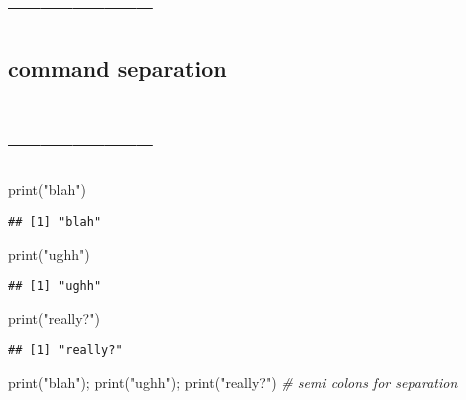 \documentclass[
]{article}
\newenvironment{Shaded}{\begin{snugshade}}{\end{snugshade}}
\newcommand{\CommentTok}[1]{\textcolor[rgb]{0.56,0.35,0.01}{\textit{#1}}}
\newcommand{\FunctionTok}[1]{\textcolor[rgb]{0.00,0.00,0.00}{#1}}
\newcommand{\NormalTok}[1]{#1}
\newcommand{\StringTok}[1]{\textcolor[rgb]{0.31,0.60,0.02}{#1}}
\begin{document}
\hypertarget{section-6}{%
\section{--------------}\label{section-6}}

\hypertarget{command-separation}{%
\subsection{command separation}\label{command-separation}}

\hypertarget{section-7}{%
\section{--------------}\label{section-7}}

\begin{Shaded}
\begin{Highlighting}[]
\FunctionTok{print}\NormalTok{(}\StringTok{"blah"}\NormalTok{)}
\end{Highlighting}
\end{Shaded}

\begin{verbatim}
## [1] "blah"
\end{verbatim}

\begin{Shaded}
\begin{Highlighting}[]
\FunctionTok{print}\NormalTok{(}\StringTok{"ughh"}\NormalTok{)}
\end{Highlighting}
\end{Shaded}

\begin{verbatim}
## [1] "ughh"
\end{verbatim}

\begin{Shaded}
\begin{Highlighting}[]
\FunctionTok{print}\NormalTok{(}\StringTok{"really?"}\NormalTok{)}
\end{Highlighting}
\end{Shaded}

\begin{verbatim}
## [1] "really?"
\end{verbatim}

\begin{Shaded}
\begin{Highlighting}[]
\FunctionTok{print}\NormalTok{(}\StringTok{"blah"}\NormalTok{); }\FunctionTok{print}\NormalTok{(}\StringTok{"ughh"}\NormalTok{); }\FunctionTok{print}\NormalTok{(}\StringTok{"really?"}\NormalTok{)  }\CommentTok{\# semi colons for separation}
\end{Highlighting}
\end{Shaded}
\end{document}

